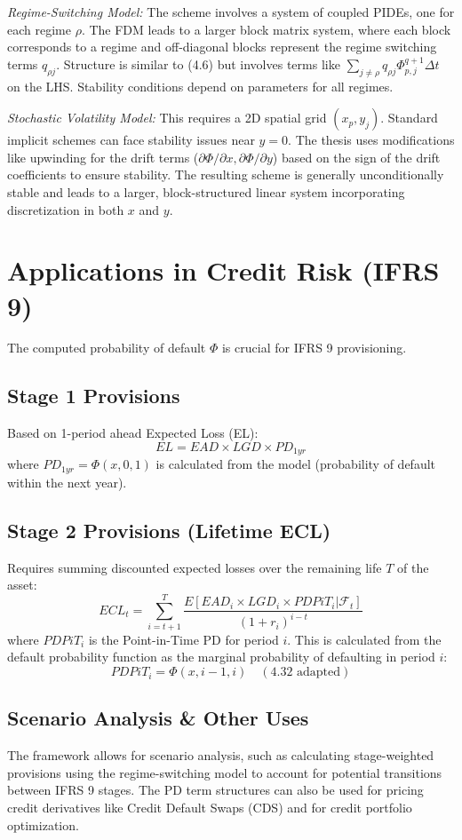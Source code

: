 \documentclass[11pt,twoside,openright]{report}
\begin{document}
\textit{Regime-Switching Model:}
The scheme involves a system of coupled PIDEs, one for each regime $\rho$. The FDM leads to a larger block matrix system, where each block corresponds to a regime and off-diagonal blocks represent the regime switching terms $q_{\rho j}$. Structure is similar to (4.6) but involves terms like $\sum_{j\neq \rho} q_{\rho j} \Phi^{q+1}_{p,j} \Delta t$ on the LHS. Stability conditions depend on parameters for all regimes.

\textit{Stochastic Volatility Model:}
This requires a 2D spatial grid $(x_p, y_j)$. Standard implicit schemes can face stability issues near $y=0$. The thesis uses modifications like upwinding for the drift terms ($\partial \Phi / \partial x, \partial \Phi / \partial y$) based on the sign of the drift coefficients to ensure stability. The resulting scheme is generally unconditionally stable and leads to a larger, block-structured linear system incorporating discretization in both $x$ and $y$.

\section{Applications in Credit Risk (IFRS 9)}

The computed probability of default $\Phi$ is crucial for IFRS 9 provisioning.

\subsection{Stage 1 Provisions}
Based on 1-period ahead Expected Loss (EL):
$$ EL = EAD \times LGD \times PD_{1yr} $$
where $PD_{1yr} = \Phi(x, 0, 1)$ is calculated from the model (probability of default within the next year).

\subsection{Stage 2 Provisions (Lifetime ECL)}
Requires summing discounted expected losses over the remaining life $T$ of the asset:
$$ ECL_t = \sum_{i=t+1}^{T} \frac{E[EAD_i \times LGD_i \times PDPiT_i | \mathcal{F}_t]}{(1+r_i)^{i-t}} $$
where $PDPiT_i$ is the Point-in-Time PD for period $i$. This is calculated from the default probability function as the marginal probability of defaulting in period $i$:
$$ PDPiT_i = \Phi(x, i-1, i) \quad (4.32 \text{ adapted}) $$


\subsection{Scenario Analysis & Other Uses}
The framework allows for scenario analysis, such as calculating stage-weighted provisions using the regime-switching model to account for potential transitions between IFRS 9 stages. The PD term structures can also be used for pricing credit derivatives like Credit Default Swaps (CDS) and for credit portfolio optimization.
\end{document}
